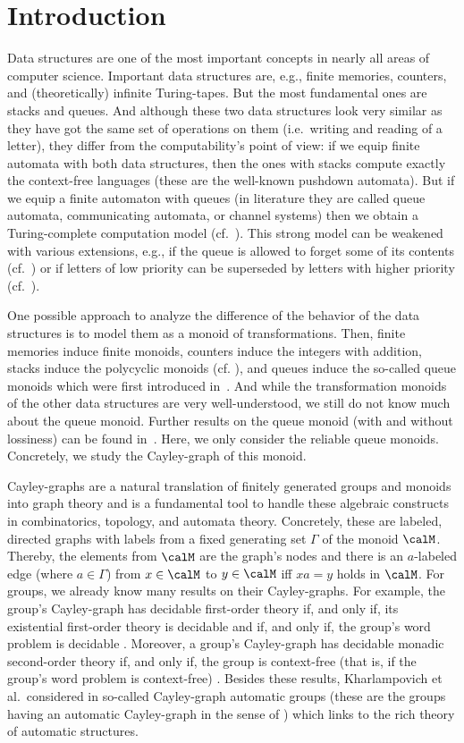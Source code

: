 \section{Introduction}
Data structures are one of the most important concepts in nearly all areas of computer science. Important data structures are, e.g., finite memories, counters, and (theoretically) infinite Turing-tapes. But the most fundamental ones are stacks and queues. And although these two data structures look very similar as they have got the same set of operations on them (i.e.\ writing and reading of a letter), they differ from the computability's point of view: if we equip finite automata with both data structures, then the ones with stacks compute exactly the context-free languages (these are the well-known pushdown automata). But if we equip a finite automaton with queues (in literature they are called queue automata, communicating automata, or channel systems) then we obtain a Turing-complete computation model (cf.~\cite{BraZ83,Bol06}). This strong model can be weakened with various extensions, e.g., if the queue is allowed to forget some of its contents (cf.~\cite{AbdJ96,CecFP96,MasS02}) or if letters of low priority can be superseded by letters with higher priority (cf.~\cite{HaaSS14}).

One possible approach to analyze the difference of the behavior of the data structures is to model them as a monoid of transformations. Then, finite memories induce finite monoids, counters induce the integers with addition, stacks induce the polycyclic monoids (cf. \cite{Sak86,kambites2009}), and queues induce the so-called queue monoids which were first introduced in~\cite{HusKZ17}. And while the transformation monoids of the other data structures are very well-understood, we still do not know much about the queue monoid. Further results on the queue monoid (with and without lossiness) can be found in~\cite{KKP18,Koe18}. Here, we only consider the reliable queue monoids. Concretely, we study the Cayley-graph of this monoid.

Cayley-graphs are a natural translation of finitely generated groups and monoids into graph theory and is a fundamental tool to handle these algebraic constructs in combinatorics, topology, and automata theory. Concretely, these are labeled, directed graphs with labels from a fixed generating set $\varGamma$ of the monoid $\calM$. Thereby, the elements from $\calM$ are the graph's nodes and there is an $a$-labeled edge (where $a\in\varGamma$) from $x\in\calM$ to $y\in\calM$ iff $xa=y$ holds in $\calM$. For groups, we already know many results on their Cayley-graphs. For example, the group's Cayley-graph has decidable first-order theory if, and only if, its existential first-order theory is decidable and if, and only if, the group's word problem is decidable \cite{KusL05}. Moreover, a group's Cayley-graph has decidable monadic second-order theory if, and only if, the group is context-free (that is, if the group's word problem is context-free) \cite{MulS85,KusL05}. Besides these results, Kharlampovich et al.\ considered in \cite{KKM14} so-called Cayley-graph automatic groups (these are the groups having an automatic Cayley-graph in the sense of \cite{KN95}) which links to the rich theory of automatic structures.

